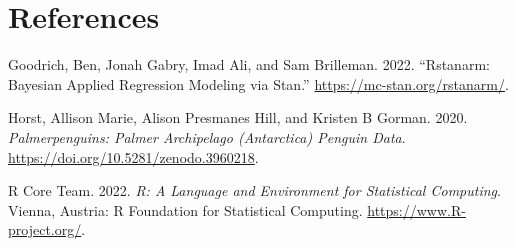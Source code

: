 \documentclass[
  letterpaper,
  DIV=11,
  numbers=noendperiod]{scrartcl}
\newlength{\cslhangindent}
\newenvironment{CSLReferences}[2] %
 {\begin{list}{}{%
  \setlength{\itemindent}{0pt}
  \setlength{\leftmargin}{0pt}
  \setlength{\parsep}{0pt}
  \ifodd #1
   \setlength{\leftmargin}{\cslhangindent}
   \setlength{\itemindent}{-1\cslhangindent}
  \fi
  \setlength{\itemsep}{#2\baselineskip}}}
 {\end{list}}
\begin{document}
\newpage

\section*{References}\label{references}

\label{refs}
\begin{CSLReferences}{1}{0}
Goodrich, Ben, Jonah Gabry, Imad Ali, and Sam Brilleman. 2022.
{``Rstanarm: {Bayesian} Applied Regression Modeling via {Stan}.''}
\url{https://mc-stan.org/rstanarm/}.

Horst, Allison Marie, Alison Presmanes Hill, and Kristen B Gorman. 2020.
\emph{Palmerpenguins: Palmer Archipelago (Antarctica) Penguin Data}.
\url{https://doi.org/10.5281/zenodo.3960218}.

R Core Team. 2022. \emph{R: A Language and Environment for Statistical
Computing}. Vienna, Austria: R Foundation for Statistical Computing.
\url{https://www.R-project.org/}.

\end{CSLReferences}
\end{document}
